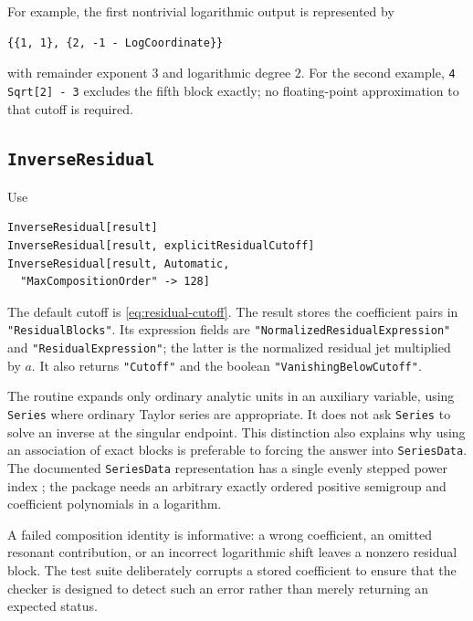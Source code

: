 \documentclass[11pt,a4paper]{article}
\numberwithin{equation}{section}
\theoremstyle{definition}
\newcommand{\code}[1]{\texttt{#1}}
\begin{document}
For example, the first nontrivial logarithmic output is represented by
\begin{lstlisting}
{{1, 1}, {2, -1 - LogCoordinate}}
\end{lstlisting}
with remainder exponent $3$ and logarithmic degree $2$. For the second
example, \code{4 Sqrt[2] - 3} excludes the fifth block exactly; no
floating-point approximation to that cutoff is required.

\subsection{\texttt{InverseResidual}}
Use
\begin{lstlisting}
InverseResidual[result]
InverseResidual[result, explicitResidualCutoff]
InverseResidual[result, Automatic,
  "MaxCompositionOrder" -> 128]
\end{lstlisting}
The default cutoff is \eqref{eq:residual-cutoff}. The result stores the
coefficient pairs in \code{"ResidualBlocks"}. Its expression fields are
\code{"NormalizedResidualExpression"} and \code{"ResidualExpression"};
the latter is the normalized residual jet multiplied by $a$. It also
returns \code{"Cutoff"} and the boolean \code{"VanishingBelowCutoff"}.

The routine expands only ordinary analytic units in an auxiliary
variable, using \code{Series} where ordinary Taylor series are appropriate.
It does not ask \code{Series} to solve an inverse at the singular endpoint.
This distinction also explains why using an association of exact blocks
is preferable to forcing the answer into \code{SeriesData}. The documented
\code{SeriesData} representation has a single evenly stepped power index
\cite{seriesdata}; the package needs an arbitrary exactly ordered
positive semigroup and coefficient polynomials in a logarithm.

A failed composition identity is informative: a wrong coefficient, an
omitted resonant contribution, or an incorrect logarithmic shift leaves
a nonzero residual block. The test suite deliberately corrupts a stored
coefficient to ensure that the checker is designed to detect such an
error rather than merely returning an expected status.
\end{document}
